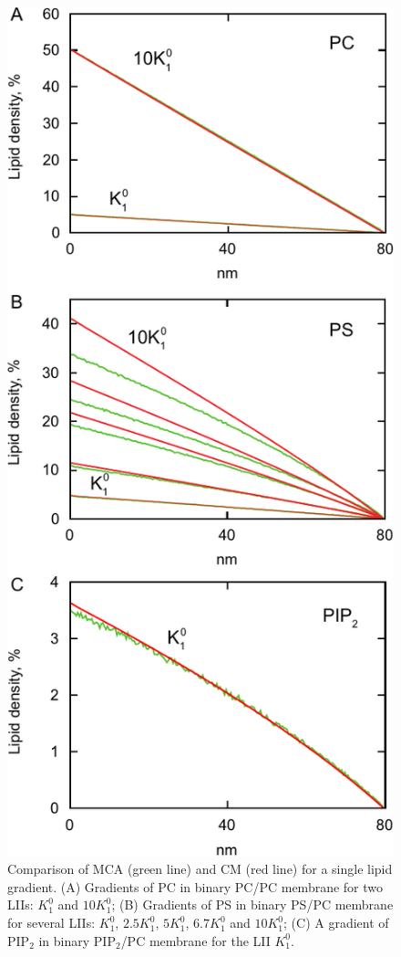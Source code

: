 \begin{figure}[!ht]
  \includegraphics[scale=1.03]{../figures/single_gradient_half_lattice.pdf}

\caption[Comparison of CM and MCA for a single lipid gradient]{Comparison of MCA (green line) and CM (red line) for a single lipid gradient. (A) Gradients of PC in binary PC/PC membrane for two LIIs: $K_1^0$ and $10K_1^0$; (B) Gradients of PS in binary PS/PC membrane for several LIIs: $K_1^0$, $2.5 K_1^0$, $5 K_1^0$, $6.7 K_1^0$ and $10 K_1^0$; (C) A gradient of PIP$_2$ in binary PIP$_2$/PC membrane for the LII $K_1^0$.}
\label{fig:single_gradient}
\end{figure}
